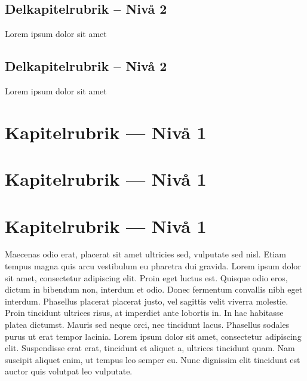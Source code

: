 \subsection{Delkapitelrubrik -- Nivå 2}
Lorem ipsum dolor sit amet
\subsection{Delkapitelrubrik -- Nivå 2}
Lorem ipsum dolor sit amet

\section{Kapitelrubrik --- Nivå 1}

\section{Kapitelrubrik --- Nivå 1}

\section{Kapitelrubrik --- Nivå 1}

Maecenas odio erat, placerat sit amet \citet{tpp} ultricies sed, vulputate sed nisl. Etiam tempus magna quis arcu vestibulum eu pharetra dui gravida. Lorem ipsum dolor sit amet, consectetur adipiscing elit. Proin eget luctus est. Quisque odio eros, dictum in bibendum non, interdum et odio. Donec fermentum convallis nibh eget interdum. Phasellus placerat placerat justo, vel sagittis velit viverra molestie. Proin tincidunt ultrices risus, at imperdiet ante lobortis in. In hac habitasse platea dictumst. Mauris sed neque orci, nec tincidunt lacus. Phasellus sodales purus ut erat tempor lacinia. Lorem ipsum dolor sit amet, consectetur adipiscing elit. Suspendisse erat erat, tincidunt et aliquet a, ultrices tincidunt quam. Nam suscipit aliquet enim, ut tempus leo semper eu. Nunc dignissim elit tincidunt est auctor quis volutpat leo vulputate.
